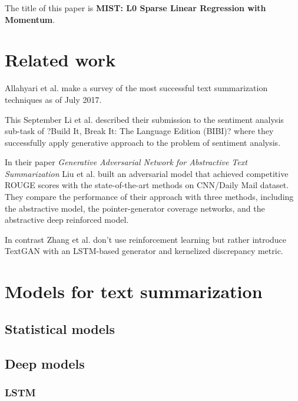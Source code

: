 \documentclass[sigplan]{acmart}
\begin{document}
The title of this paper is \textbf{MIST: L0 Sparse Linear Regression with Momentum}.

\section{Related work}

Allahyari et al.\cite{allahyari-17} make a survey of the most successful text summarization techniques as of July 2017.

This September Li et al. \cite{li-cohn-17} described their submission to the sentiment analysis sub-task of ?Build It, Break It: The Language Edition (BIBI)? where they successfully apply generative approach to the problem of sentiment analysis.

In their paper \textit{Generative Adversarial Network for Abstractive Text Summarization} Liu et al.\cite{liu-17} built an adversarial model that achieved competitive ROUGE scores with the state-of-the-art methods on CNN/Daily Mail dataset. They compare the performance of their approach with three methods, including the abstractive model, the pointer-generator coverage networks, and the abstractive deep reinforced model.

In contrast Zhang et al.\cite{zhang-17} don't use reinforcement learning but rather introduce TextGAN with an LSTM-based generator and kernelized discrepancy metric.



\section{Models for text summarization}
\subsection{Statistical models}

\subsection{Deep models}

\subsubsection{LSTM}
\end{document}
